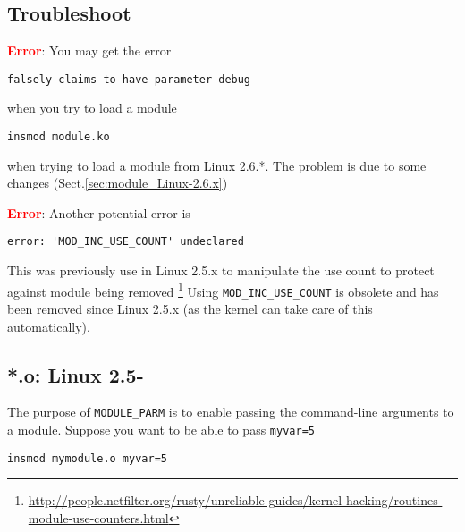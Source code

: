 \subsection{Troubleshoot}

\textcolor{red}{\bf Error}:
You may get the error
\begin{verbatim}
falsely claims to have parameter debug 
\end{verbatim}
when you try to load a module
\begin{verbatim}
insmod module.ko
\end{verbatim}
when trying to load a module from Linux 2.6.*. The problem is due to some
changes (Sect.\ref{sec:module_Linux-2.6.x})

\textcolor{red}{\bf Error}: Another potential error is 
\begin{verbatim}
error: 'MOD_INC_USE_COUNT' undeclared
\end{verbatim}
This was previously use in Linux 2.5.x to manipulate the use count to protect
against module being removed
\footnote{\url{http://people.netfilter.org/rusty/unreliable-guides/kernel-hacking/routines-module-use-counters.html}}
Using \verb!MOD_INC_USE_COUNT! is obsolete and has been removed since Linux
2.5.x (as the kernel can take care of this automatically).



\subsection{*.o: Linux 2.5-}
\label{sec:module_Linux-2.5-}

The purpose of \verb!MODULE_PARM! is to enable passing the command-line
arguments to a module. Suppose you want to be able to pass \verb!myvar=5!
\begin{verbatim}
insmod mymodule.o myvar=5
\end{verbatim}

